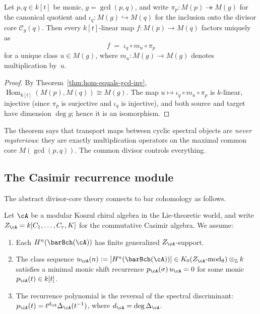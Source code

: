 \begin{theorem}
\label{thm:factorization-through-common-core-inv}
Let $p,q \in k[t]$ be monic, $g = \gcd(p,q)$, and write
$\pi_p \colon M(p) \twoheadrightarrow M(g)$ for the canonical
quotient and $\iota_q \colon M(g) \hookrightarrow M(q)$ for
the inclusion onto the divisor core $\mathcal{C}_g(q)$. Then
every $k[t]$-linear map $f \colon M(p) \to M(q)$ factors
uniquely as
\[
f \;=\; \iota_q \circ m_u \circ \pi_p
\]
for a unique class $u \in M(g)$, where
$m_u \colon M(g) \to M(g)$ denotes multiplication by~$u$.
\end{theorem}

\begin{proof}
By Theorem~\ref{thm:hom-equals-gcd-inv},
$\operatorname{Hom}_{k[t]}(M(p),M(q)) \cong M(g)$. The map
$u \mapsto \iota_q \circ m_u \circ \pi_p$ is $k$-linear,
injective (since $\pi_p$ is surjective and $\iota_q$ is
injective), and both source and target have dimension
$\deg g$; hence it is an isomorphism.
\end{proof}

\begin{remark}
The theorem says that transport maps between cyclic spectral
objects are \emph{never mysterious}: they are exactly
multiplication operators on the maximal common core
$M(\gcd(p,q))$. The common divisor controls everything.
\end{remark}

\subsection{The Casimir recurrence module}
\label{subsec:casimir-recurrence-module}

The abstract divisor-core theory connects to bar cohomology as
follows.

\begin{hypothesis}
\label{hyp:finite-character-recurrence-inv}
Let $\cA$ be a modular Koszul chiral algebra in the
Lie-theoretic world, and write $Z_\cA = k[C_1,\ldots,C_r,K]$
for the commutative Casimir algebra. We assume:
\begin{enumerate}[label=\textup{(\roman*)}]
\item Each $H^n(\barBch(\cA))$ has finite generalized
 $Z_\cA$-support.
\item The class sequence
 $u_\cA(n) := [H^n(\barBch(\cA))] \in K_0(Z_\cA\text{-mod}_{\mathrm{fl}})
 \otimes_{\mathbb{Z}} k$
 satisfies a minimal monic shift recurrence
 $p_\cA(\sigma)\,u_\cA = 0$
 for some monic $p_\cA(t) \in k[t]$.
\item The recurrence polynomial is the reversal of the
 spectral discriminant:
 $p_\cA(t) = t^{d_\cA}\Delta_\cA(t^{-1})$,
 where $d_\cA = \deg\Delta_\cA$.
\end{enumerate}
\end{hypothesis}

